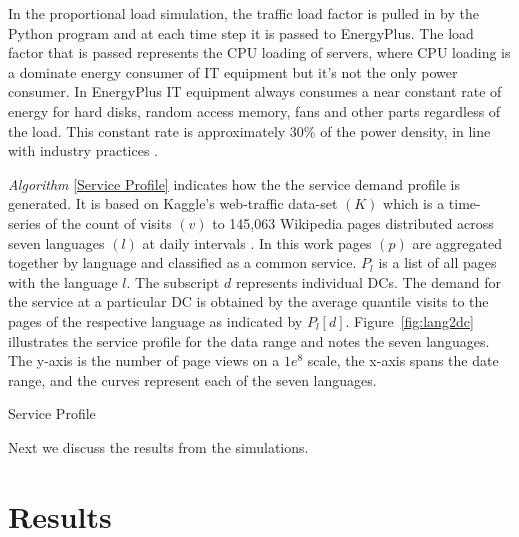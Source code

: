 In the proportional load simulation, the traffic load factor is pulled in by the Python program and at each time step it is passed to EnergyPlus. The load factor that is passed represents the CPU loading of servers, where CPU loading is a dominate energy consumer of IT equipment but it’s not the only power consumer. In EnergyPlus IT equipment always consumes a near constant rate of energy for hard disks, random access memory, fans and other parts regardless of the load. This constant rate is approximately 30\% of the power density, in line with industry practices \citep{barroso18}. 

\textit{Algorithm} \ref{Service Profile} indicates how the the service demand profile is generated. It is based on Kaggle's web-traffic data-set $(K)$ which is a time-series of the count of visits $(v)$ to 145,063 Wikipedia pages distributed across seven languages $(l)$ at daily intervals \citep{kaggle17}. In this work  pages $(p)$ are aggregated together by language and classified as a common service. $P_l$ is a list of all pages with the language $l$. The subscript $d$ represents individual DCs.  The demand for the service at a particular DC is obtained by the average quantile visits to the pages of the respective language as indicated by $P_{l}[d]$.  Figure~\ref{fig:lang2dc} illustrates the service profile for the data range and notes the seven languages. The y-axis is the number of page views on a $1e^8$ scale, the x-axis spans the date range, and the curves represent each of the seven languages.

\begin{algorithm}
\caption{Service Profile}
\begin{algorithmic}[1]
	\ENDFOR
	\ENDFOR
\end{algorithmic}
\label{Service Profile}
\end{algorithm}

Next we discuss the results from the simulations. 

\section*{Results}

